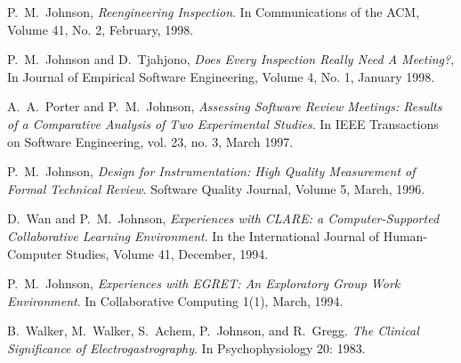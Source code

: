 \begin{Journal Publications}
\item P.~M.~Johnson, {\em Reengineering Inspection}.
  In Communications of the ACM, Volume 41, No. 2, 
  February, 1998.

\item P.~M.~Johnson and D.~Tjahjono, {\em Does Every Inspection Really Need A Meeting?}, 
      In Journal of Empirical Software Engineering, Volume 4,
      No. 1, January 1998.

\item A.~A.~Porter and P.~M.~Johnson, {\em Assessing Software Review
    Meetings: Results of a Comparative Analysis of Two Experimental
    Studies}.  In IEEE Transactions on Software Engineering, vol. 23, no. 3, March
    1997.

\item P.~M.~Johnson, {\em Design for Instrumentation: High Quality
  Measurement of Formal Technical Review}.  Software
  Quality Journal, Volume 5, March, 1996.
  
\item D.~Wan and P.~M.~Johnson, {\em Experiences with CLARE: a
  Computer-Supported Collaborative Learning Environment}.  
 In the International Journal of Human-Computer Studies, Volume 41, 
 December, 1994.

  
\item P.~M.~Johnson, {\em Experiences with EGRET: An Exploratory Group
  Work Environment}. In Collaborative Computing 1(1), March, 1994.
  
\item B.~Walker, M.~Walker, S.~Achem, P.~Johnson, and R.~Gregg.
     {\em The Clinical Significance of Electrogastrography}.
     In Psychophysiology 20: 1983.

\end{Journal Publications}  



